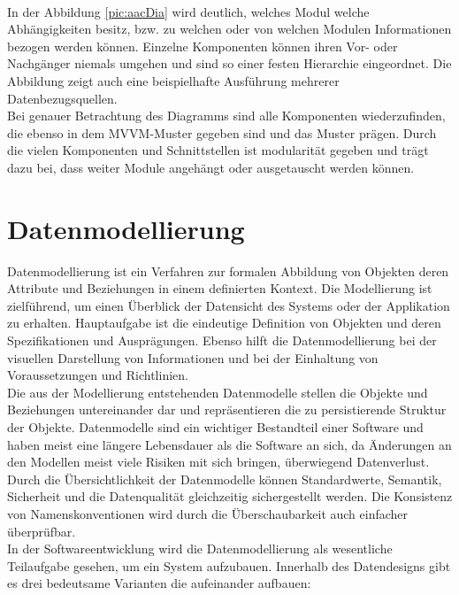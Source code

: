 \\ 
In der Abbildung \ref{pic:aacDia} wird deutlich, welches Modul welche Abhängigkeiten besitz, bzw. zu welchen oder von welchen Modulen 
Informationen bezogen werden können. Einzelne Komponenten können ihren Vor- oder Nachgänger niemals umgehen und sind so einer festen 
Hierarchie eingeordnet. Die Abbildung zeigt auch eine beispielhafte Ausführung mehrerer Datenbezugsquellen.
\\ 
Bei genauer Betrachtung des Diagramms sind alle Komponenten wiederzufinden, die ebenso in dem MVVM-Muster gegeben 
sind und das Muster prägen. Durch die vielen Komponenten und Schnittstellen ist modularität gegeben und trägt dazu bei, dass weiter Module 
angehängt oder ausgetauscht werden können. 

\section{Datenmodellierung}
\label{chap:Datenmodellierung}
Datenmodellierung ist ein Verfahren zur formalen Abbildung von Objekten deren Attribute und Beziehungen in einem definierten Kontext. Die 
Modellierung ist zielführend, um einen Überblick der Datensicht des Systems oder der Applikation zu erhalten. Hauptaufgabe ist die eindeutige 
Definition von Objekten und deren Spezifikationen und Ausprägungen. Ebenso hilft die Datenmodellierung bei der visuellen Darstellung von 
Informationen und bei der Einhaltung von Voraussetzungen und Richtlinien.
\\ 
Die aus der Modellierung entstehenden Datenmodelle stellen die Objekte und Beziehungen untereinander dar und repräsentieren die zu 
persistierende Struktur der Objekte. Datenmodelle sind ein wichtiger Bestandteil einer Software und haben meist eine längere Lebensdauer als 
die Software an sich, da Änderungen an den Modellen meist viele Risiken mit sich bringen, überwiegend Datenverlust.
\\ 
\linebreak
Durch die Übersichtlichkeit der Datenmodelle können Standardwerte, Semantik, Sicherheit und die Datenqualität gleichzeitig sichergestellt 
werden. Die Konsistenz von Namenskonventionen wird durch die Überschaubarkeit auch einfacher überprüfbar. 
\\ 
\linebreak
In der Softwareentwicklung wird die Datenmodellierung als wesentliche Teilaufgabe gesehen, um ein System aufzubauen. Innerhalb des 
Datendesigns gibt es drei bedeutsame Varianten die aufeinander aufbauen:
\pagebreak
